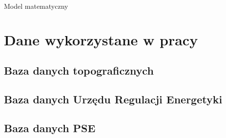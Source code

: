 Model matematyczny

\section{Dane wykorzystane w pracy}

\subsection{Baza danych topograficznych}

\subsection{Baza danych Urzędu Regulacji Energetyki}

\subsection{Baza danych PSE}

\section{}